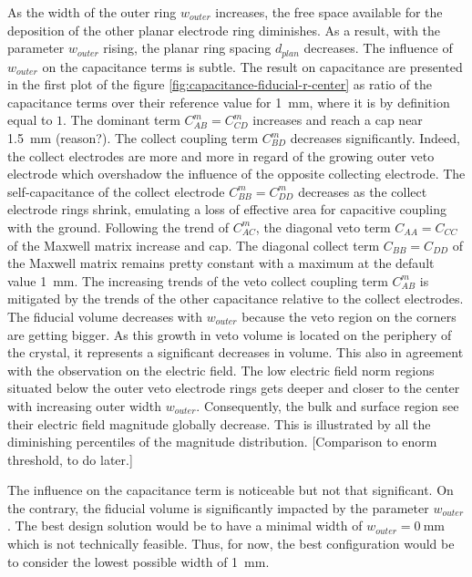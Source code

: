 As the width of the outer ring $w_{outer}$ increases, the free space available for the deposition of the other planar electrode ring diminishes. As a result, with the parameter $w_{outer}$ rising, the planar ring spacing $d_{plan}$ decreases.
The influence of $w_{outer}$ on the capacitance terms is subtle. The result on capacitance are presented in the first plot of the figure \ref{fig:capacitance-fiducial-r-center} as ratio of the capacitance terms over their reference value for \SI{1}{\mm}, where it is by definition equal to $1$. The dominant term $C_{AB}^m=C_{CD}^m$ increases and reach a cap near \SI{1.5}{\mm} (reason?). The collect coupling term $C_{BD}^m$ decreases significantly.  Indeed, the collect electrodes are more and more in regard of the growing outer veto electrode which overshadow the influence of the opposite collecting electrode. The self-capacitance of the collect electrode $C_{BB}^m=C_{DD}^m$ decreases as the collect electrode rings shrink, emulating a loss of effective area for capacitive coupling with the ground. Following the trend of $C_{AC}^m$, the diagonal veto term $C_{AA} = C_{CC}$ of the Maxwell matrix increase and cap. The diagonal collect term $C_{BB} = C_{DD}$ of the Maxwell matrix remains pretty constant with a maximum at the default value \SI{1}{\mm}. The increasing trends of the veto collect coupling term $C_{AB}^m$ is mitigated by the trends of the other capacitance relative to the collect electrodes.
The fiducial volume decreases with $w_{outer}$ because the veto region on the corners are getting bigger. As this growth in veto volume is located on the periphery of the crystal, it represents a significant decreases in volume.
This also in agreement with the observation on the electric field. The low electric field norm regions situated below the outer veto electrode rings gets deeper and closer to the center with increasing outer width $w_{outer}$. Consequently, the bulk and surface region see their electric field magnitude globally decrease. This is illustrated by all the diminishing percentiles of the magnitude distribution. {\color{red} [Comparison to enorm threshold, to do later.]}

The influence on the capacitance term is noticeable but not that significant. On the contrary, the fiducial volume is significantly impacted by the parameter $w_{outer}$. The best design solution would be to have a minimal width of $w_{outer}=\SI{0}{\mm}$ which is not technically feasible. Thus, for now, the best configuration would be to consider the lowest possible width of \SI{1}{\mm}.


